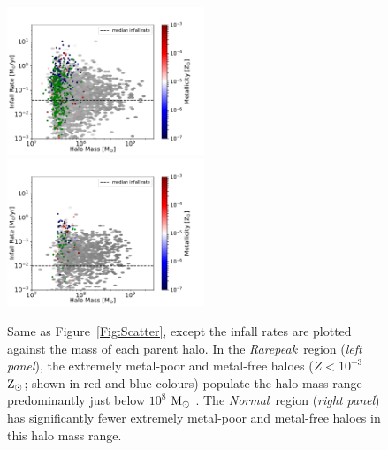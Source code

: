 \documentclass[graphics, twocolumn, usenatbib]{mn2e}
\newcommand{\msolar} {$\rm{M_{\odot}}~$}
\newcommand{\zsolarc} {$\rm{Z_{\odot}}$}
\newcommand{\rarepeak} {\textit{Rarepeak~}}
\newcommand{\normal} {\textit{Normal~}}
\newcommand{\void} {\textit{Void~}}
\begin{document}
\begin{figure}
\centering
\begin{minipage}{175mm}      \begin{center} 
\centerline{
\includegraphics[width=0.525\textwidth]{FIGURES/Rarepeak_MdotMHaloZ_Hexbin.pdf}
\includegraphics[width=0.525\textwidth]{FIGURES/Normal_MdotMHaloZ_Hexbin.pdf}}
\caption{Same as Figure~\ref{Fig:Scatter}, except
the infall rates are plotted against the mass of each parent halo.
In the \rarepeak region (\textit{left panel}), the extremely metal-poor
  and metal-free haloes ($Z < 10^{-3}$ \zsolarc; shown in red and blue colours) populate the halo mass range predominantly just below $10^{8}$
  \msolar.  The \normal region (\textit{right panel})
 has significantly fewer extremely metal-poor and metal-free haloes in this halo mass range.}
\label{Fig:HaloMass}
\end{center} \end{minipage}

\end{figure}
\end{document}
